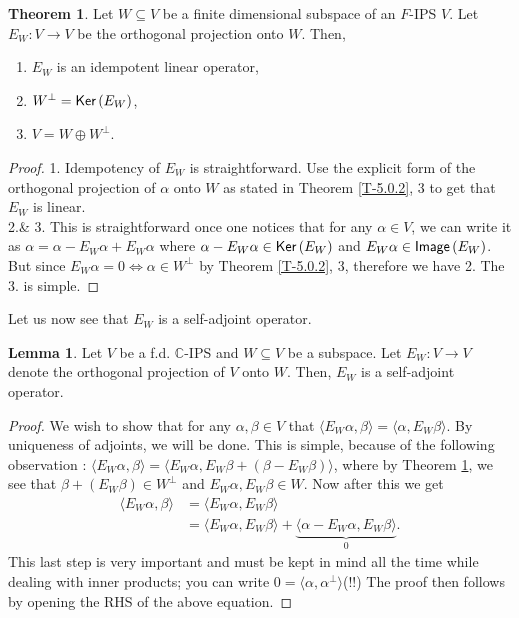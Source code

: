 \documentclass[letterpaper,11pt,twoside]{article}
\theoremstyle{definition}
\theoremstyle{definition}
\newtheorem{theorem}[proposition]{Theorem}
\theoremstyle{definition}
\theoremstyle{definition}
\newtheorem{lemma}[proposition]{\textbf{Lemma}}
\theoremstyle{definition}
\theoremstyle{definition}
\theoremstyle{remark}
\theoremstyle{definition}
\newcommand{\Ker}[1]{{\fontfamily{lmss}\selectfont 
		\text{Ker}\left (#1\right )
}}
\newcommand{\Image}[1]{{\fontfamily{lmss}\selectfont 
		\text{Image}\left (#1\right )
}}
\newcommand{\ip}[2]{\langle #1,#2 \rangle}
\newcommand{\C}{\mathbb{C}}
\begin{document}
    \begin{theorem}\label{T-5.0.5}
    	Let $ W\subseteq  V$ be a finite dimensional subspace of an $ F $-IPS $ V $. Let $ E_W : V\to V $ be the orthogonal projection onto $ W $. Then,
    	\begin{enumerate}
    		\item {$ E_W $ is an idempotent linear operator,}
    		\item {$ W^{\perp} = \Ker{E_W}$,}
    		\item {$ V = W\oplus W^{\perp} $.}
    	\end{enumerate}
    \end{theorem}
    \begin{proof}
    	1. Idempotency of $ E_W $ is straightforward. Use the explicit form of the orthogonal projection of $ \alpha $ onto $ W $ as stated in Theorem \ref{T-5.0.2}, 3 to get that $ E_W $ is linear.\\
    	2.\& 3. This is straightforward once one notices that for any $ \alpha \in V $, we can write it as $ \alpha = \alpha -E_W\alpha + E_W\alpha$ where $ \alpha- E_W\alpha \in \Ker{E_W} $ and $ E_W\alpha \in \Image{E_W} $. But since $ E_W\alpha = 0 \iff \alpha \in W^{\perp} $ by Theorem \ref{T-5.0.2}, 3, therefore we have 2. The 3. is simple.
    \end{proof}
	Let us now see that $ E_W $ is a self-adjoint operator.
	\begin{lemma}\label{L-5.1.6}
		Let $ V $ be a f.d. $ \C $-IPS and $ W\subseteq V $ be a subspace. Let $ E_W : V\to V $ denote the orthogonal projection of $ V $ onto $ W $. Then, $ E_W $ is a self-adjoint operator.
	\end{lemma}
    \begin{proof}
    	We wish to show that for any $ \alpha,\beta\in V $ that $ \ip{E_W\alpha}{\beta} = \ip{\alpha}{E_W\beta} $. By uniqueness of adjoints, we will be done. This is simple, because of the following observation : $ \ip{E_W\alpha}{\beta} = \ip{E_W\alpha}{E_W\beta + (\beta - E_W\beta)} $, where by Theorem \ref{T-5.0.5}, we see that $ \beta+ (E_W\beta) \in W^{\perp}$ and $ E_W\alpha,E_W\beta \in W $. Now after this we get
    	\begin{align*}
    		\ip{E_W\alpha}{\beta} &= \ip{E_W\alpha}{E_W\beta}\\
    		&= \ip{E_W\alpha}{E_W\beta} + \underbrace{ \ip{\alpha - E_W\alpha}{E_W  \beta} }_{0}.
    	\end{align*}
    	This last step is very important and must be kept in mind all the time while dealing with inner products; you can write $ 0 = \ip{\alpha}{\alpha^{\perp}} $(!!) The proof then follows by opening the RHS of the above equation.
    \end{proof}
\end{document}
